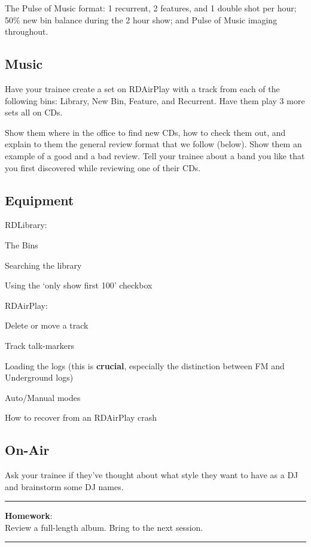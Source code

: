 \documentclass[]{witrman}
\newcommand{\makehomework}[1]{%
\vspace{1mm}
\rule{\textwidth}{1pt}
\textbf{Homework}:\\
#1\\
\rule[2mm]{\textwidth}{1pt}
}
\begin{document}
The Pulse of Music format: 1 recurrent, 2 features, and 1 double shot per hour;
50\% new bin balance during the 2 hour show; and Pulse of Music imaging
throughout.

\subsection{Music}

Have your trainee create a set on RDAirPlay with a track from each of the
following bins: Library, New Bin, Feature, and Recurrent.  Have them play 3 more
sets all on CDs.

Show them where in the office to find new CDs, how to check them out, and
explain to them the general review format that we follow (below).  Show them an
example of a good and a bad review.  Tell your trainee about a band you like
that you first discovered while reviewing one of their CDs.

\subsection{Equipment}

RDLibrary:
\begin{tightitemize}
    \item The Bins
    \item Searching the library
    \item Using the `only show first 100' checkbox
\end{tightitemize}

RDAirPlay:
\begin{tightitemize}
    \item Delete or move a track
    \item Track talk-markers
    \item Loading the logs (this is \textbf{crucial}, especially the distinction
        between FM and Underground logs)
    \item Auto/Manual modes
    \item How to recover from an RDAirPlay crash
\end{tightitemize}

\subsection{On-Air}

Ask your trainee if they've thought about what style they want to have as a DJ
and brainstorm some DJ names.

\makehomework{Review a full-length album.  Bring to the next session.}
\end{document}
